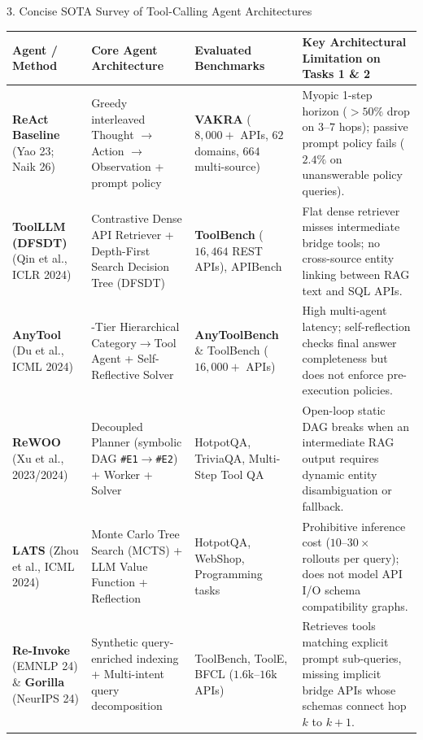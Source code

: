 \documentclass[aspectratio=169, 10pt]{beamer}
\begin{document}
\begin{frame}{3. Concise SOTA Survey of Tool-Calling Agent Architectures}
\tiny
\renewcommand{\arraystretch}{1.15}
\begin{tabularx}{\textwidth}{>{\raggedright\arraybackslash}p{2.2cm} >{\raggedright\arraybackslash}p{3.5cm} >{\raggedright\arraybackslash}p{2.4cm} >{\raggedright\arraybackslash}X}
\toprule
\textbf{Agent / Method} & \textbf{Core Agent Architecture} & \textbf{Evaluated Benchmarks} & \textbf{Key Architectural Limitation on Tasks 1 \& 2} \\
\midrule
\textbf{ReAct Baseline} (Yao 23; Naik 26) & Greedy interleaved Thought $\rightarrow$ Action $\rightarrow$ Observation + prompt policy & \textbf{VAKRA} ($8,000+$ APIs, $62$ domains, $664$ multi-source) & Myopic 1-step horizon ($>50\%$ drop on $3\text{--}7$ hops); passive prompt policy fails ($2.4\%$ on unanswerable policy queries). \\
\midrule
\textbf{ToolLLM (DFSDT)} (Qin et al., ICLR 2024) & Contrastive Dense API Retriever + Depth-First Search Decision Tree (DFSDT) & \textbf{ToolBench} ($16,464$ REST APIs), APIBench & Flat dense retriever misses intermediate bridge tools; no cross-source entity linking between RAG text and SQL APIs. \\
\midrule
\textbf{AnyTool} (Du et al., ICML 2024) & 3-Tier Hierarchical Category$\rightarrow$Tool Agent + Self-Reflective Solver & \textbf{AnyToolBench} \& ToolBench ($16,000+$ APIs) & High multi-agent latency; self-reflection checks final answer completeness but does not enforce pre-execution policies. \\
\midrule
\textbf{ReWOO} (Xu et al., 2023/2024) & Decoupled Planner (symbolic DAG \texttt{\#E1}$\rightarrow$\texttt{\#E2}) + Worker + Solver & HotpotQA, TriviaQA, Multi-Step Tool QA & Open-loop static DAG breaks when an intermediate RAG output requires dynamic entity disambiguation or fallback. \\
\midrule
\textbf{LATS} (Zhou et al., ICML 2024) & Monte Carlo Tree Search (MCTS) + LLM Value Function + Reflection & HotpotQA, WebShop, Programming tasks & Prohibitive inference cost ($10\text{--}30\times$ rollouts per query); does not model API I/O schema compatibility graphs. \\
\midrule
\textbf{Re-Invoke} (EMNLP 24) \& \textbf{Gorilla} (NeurIPS 24) & Synthetic query-enriched indexing + Multi-intent query decomposition & ToolBench, ToolE, BFCL ($1.6\text{k}\text{--}16\text{k}$ APIs) & Retrieves tools matching explicit prompt sub-queries, missing implicit bridge APIs whose schemas connect hop $k$ to $k+1$. \\
\bottomrule
\end{tabularx}


\end{frame}
\end{document}
